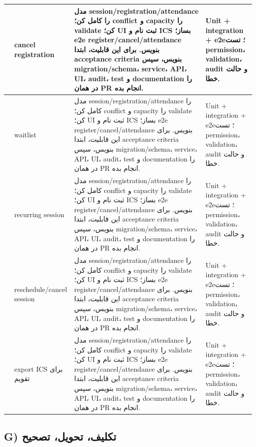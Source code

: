 \documentclass[11pt,a4paper]{article}
\begin{document}
\begin{longtable}{|>{\raggedleft\arraybackslash}p{}|>{\raggedleft\arraybackslash}p{}|>{\raggedleft\arraybackslash}p{}|>{\raggedleft\arraybackslash}p{}|}
96 & cancel registration & مدل session/registration/attendance را کامل کن؛ conflict و capacity را validate کن؛ UI ثبت نام و ICS بساز؛ e2e register/cancel/attendance بنویس. برای این قابلیت، ابتدا acceptance criteria بنویس، سپس migration/schema، service، API، UI، audit، test و documentation را در همان PR انجام بده. & Unit + integration + e2e؛ تست permission، validation، audit و حالت خطا. \\ \hline
97 & waitlist & مدل session/registration/attendance را کامل کن؛ conflict و capacity را validate کن؛ UI ثبت نام و ICS بساز؛ e2e register/cancel/attendance بنویس. برای این قابلیت، ابتدا acceptance criteria بنویس، سپس migration/schema، service، API، UI، audit، test و documentation را در همان PR انجام بده. & Unit + integration + e2e؛ تست permission، validation، audit و حالت خطا. \\ \hline
98 & recurring session & مدل session/registration/attendance را کامل کن؛ conflict و capacity را validate کن؛ UI ثبت نام و ICS بساز؛ e2e register/cancel/attendance بنویس. برای این قابلیت، ابتدا acceptance criteria بنویس، سپس migration/schema، service، API، UI، audit، test و documentation را در همان PR انجام بده. & Unit + integration + e2e؛ تست permission، validation، audit و حالت خطا. \\ \hline
99 & reschedule/cancel session & مدل session/registration/attendance را کامل کن؛ conflict و capacity را validate کن؛ UI ثبت نام و ICS بساز؛ e2e register/cancel/attendance بنویس. برای این قابلیت، ابتدا acceptance criteria بنویس، سپس migration/schema، service، API، UI، audit، test و documentation را در همان PR انجام بده. & Unit + integration + e2e؛ تست permission، validation، audit و حالت خطا. \\ \hline
100 & export ICS برای تقویم & مدل session/registration/attendance را کامل کن؛ conflict و capacity را validate کن؛ UI ثبت نام و ICS بساز؛ e2e register/cancel/attendance بنویس. برای این قابلیت، ابتدا acceptance criteria بنویس، سپس migration/schema، service، API، UI، audit، test و documentation را در همان PR انجام بده. & Unit + integration + e2e؛ تست permission، validation، audit و حالت خطا. \\ \hline
\end{longtable}
\subsection{G) تکلیف، تحویل، تصحیح}
\end{document}
